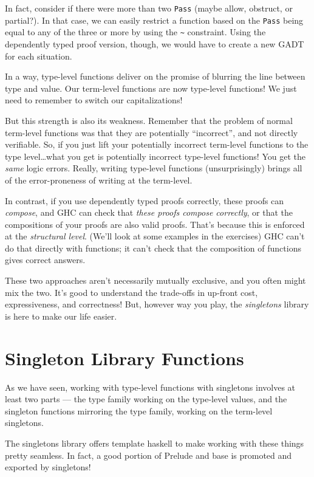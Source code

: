 \documentclass[]{article}
\begin{document}
In fact, consider if there were more than two \texttt{Pass} (maybe allow,
obstruct, or partial?). In that case, we can easily restrict a function based on
the \texttt{Pass} being equal to any of the three or more by using the
\texttt{\textasciitilde{}} constraint. Using the dependently typed proof
version, though, we would have to create a new GADT for each situation.

In a way, type-level functions deliver on the promise of blurring the line
between type and value. Our term-level functions are now type-level functions!
We just need to remember to switch our capitalizations!

But this strength is also its weakness. Remember that the problem of normal
term-level functions was that they are potentially ``incorrect'', and not
directly verifiable. So, if you just lift your potentially incorrect term-level
functions to the type level\ldots{}what you get is potentially incorrect
type-level functions! You get the \emph{same} logic errors. Really, writing
type-level functions (unsurprisingly) brings all of the error-proneness of
writing at the term-level.

In contrast, if you use dependently typed proofs correctly, these proofs can
\emph{compose}, and GHC can check that \emph{these proofs compose correctly}, or
that the compositions of your proofs are also valid proofs. That's because this
is enforced at the \emph{structural level}. (We'll look at some examples in the
exercises) GHC can't do that directly with functions; it can't check that the
composition of functions gives correct answers.

These two approaches aren't necessarily mutually exclusive, and you often might
mix the two. It's good to understand the trade-offs in up-front cost,
expressiveness, and correctness! But, however way you play, the
\emph{singletons} library is here to make our life easier.

\hypertarget{singleton-library-functions}{%
\section{Singleton Library Functions}\label{singleton-library-functions}}

As we have seen, working with type-level functions with singletons involves at
least two parts --- the type family working on the type-level values, and the
singleton functions mirroring the type family, working on the term-level
singletons.

The singletons library offers template haskell to make working with these things
pretty seamless. In fact, a good portion of Prelude and base is promoted and
exported by singletons!
\end{document}
